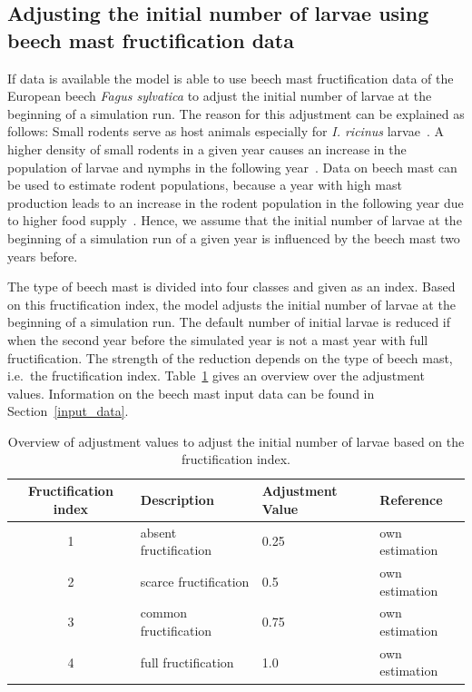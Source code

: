 \documentclass[a4paper, 11pt]{scrartcl}
\begin{document}
\subsection{Adjusting the initial number of larvae using beech mast fructification data}\label{subsubsec:initial_larvae_with_beech_mast}
If data is available the model is able to use beech mast fructification data of the European beech \textit{Fagus sylvatica} to adjust the initial number of larvae at the beginning of a simulation run. The reason for this adjustment can be explained as follows: Small rodents serve as host animals especially for \textit{I. ricinus} larvae~\parencite{Cayol.2017}. A higher density of small rodents in a given year causes an increase in the population of larvae and nymphs in the following year~\parencite{Brugger.2018}. Data on beech mast can be used to estimate rodent populations, because a year with high mast production leads to an increase in the rodent population in the following year due to higher food supply~\parencite{Clement.2009}. Hence, we assume that the initial number of larvae at the beginning of a simulation run of a given year is influenced by the beech mast two years before.

The type of beech mast is divided into four classes and given as an index. Based on this fructification index, the model adjusts the initial number of larvae at the beginning of a simulation run. The default number of initial larvae is reduced if when the second year before the simulated year is not a mast year with full fructification. The strength of the reduction depends on the type of beech mast, i.e.\ the fructification index. Table~\ref{tab:fructification_adjustment} gives an overview over the adjustment values. Information on the beech mast input data can be found in Section~\ref{input_data}.

\begin{table}[h!]
\caption[Overview of beech fructification adjustment values for model initialisation.]{Overview of adjustment values to adjust the initial number of larvae based on the fructification index.}
\label{tab:fructification_adjustment}
\begin{tabularx}{\textwidth}{clll}
\toprule
\textbf{Fructification index} & \textbf{Description}    & \textbf{Adjustment Value} & \textbf{Reference} \\
\midrule
1				 	  		  & absent fructification 	& 	0.25 & own estimation \\
2 				 	  		  & scarce fructification	&	0.5	& own estimation  \\
3 					  		  & common fructification	& 	0.75 & own estimation \\
4					 		  & full fructification 	& 	1.0	& own estimation \\
\bottomrule
\end{tabularx}
\end{table}
\end{document}
